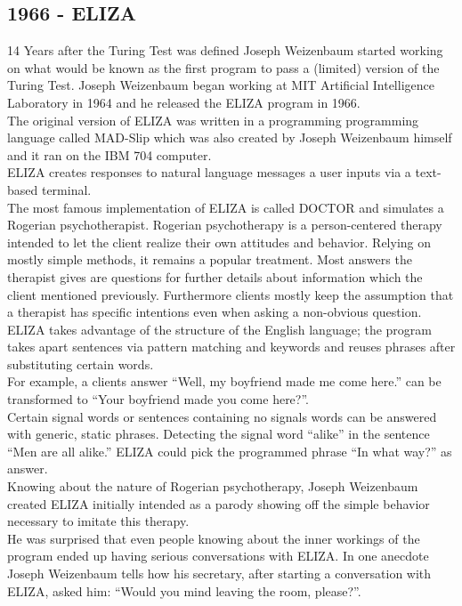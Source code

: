 \subsection{1966 - ELIZA}

14 Years after the Turing Test was defined Joseph Weizenbaum started working on what would be known as the first program to pass a (limited) version of the Turing Test. Joseph Weizenbaum began working at MIT Artificial Intelligence Laboratory in 1964 and he released the ELIZA program in 1966.
\\

The original version of ELIZA was written in a programming programming language called MAD-Slip which was also created by Joseph Weizenbaum himself and it ran on the IBM 704 computer.
\\
ELIZA creates responses to natural language messages a user inputs via a text-based terminal.
\\

The most famous implementation of ELIZA is called DOCTOR and simulates a Rogerian psychotherapist. Rogerian psychotherapy is a person-centered therapy intended to let the client realize their own attitudes and behavior. Relying on mostly simple methods, it remains a popular treatment. Most answers the therapist gives are questions for further details about information which the client mentioned previously. Furthermore clients mostly keep the assumption that a therapist has specific intentions even when asking a non-obvious question.
\\

ELIZA takes advantage of the structure of the English language; the program takes apart sentences via pattern matching and keywords and reuses phrases after substituting certain words.
\\
For example, a clients answer ``Well, my boyfriend made me come here.'' can be transformed to ``Your boyfriend made you come here?''\cite{elizatest}.
\\
Certain signal words or sentences containing no signals words can be answered with generic, static phrases. Detecting the signal word ``alike'' in the sentence ``Men are all alike.'' ELIZA could pick the programmed phrase ``In what way?'' as answer\cite{elizatest}.
\\

Knowing about the nature of Rogerian psychotherapy, Joseph Weizenbaum created ELIZA initially intended as a parody showing off the simple behavior necessary to imitate this therapy.
\\
He was surprised that even people knowing about the inner workings of the program ended up having serious conversations with ELIZA. In one anecdote Joseph Weizenbaum tells how his secretary, after starting a conversation with ELIZA, asked him: ``Would you mind leaving the room, please?''\cite[5]{weizenbaum}.
\\

